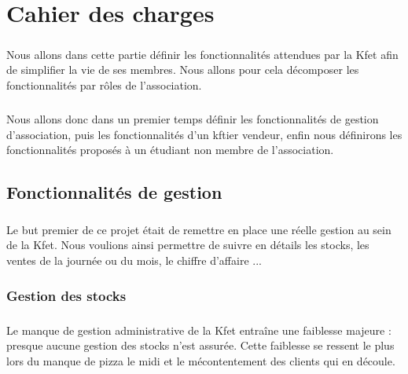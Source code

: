 \documentclass[twoside,UTF8]{EPURapport}
\begin{document}
\chapter{Cahier des charges}%

    \paragraph{}Nous allons dans cette partie définir les fonctionnalités attendues par la Kfet afin de simplifier la vie de ses membres. Nous allons pour cela décomposer les fonctionnalités par rôles de l'association. 
    \paragraph{}Nous allons donc dans un premier temps définir les fonctionnalités de gestion d'association, puis les fonctionnalités d'un kftier vendeur, enfin nous définirons les fonctionnalités proposés à un étudiant non membre de l'association.

    \section{Fonctionnalités de gestion}

        \paragraph{}Le but premier de ce projet était de remettre en place une réelle gestion au sein de la Kfet. Nous voulions ainsi permettre de suivre en détails les stocks, les ventes de la journée ou du mois, le chiffre d'affaire ...

        \subsection{Gestion des stocks}

            \paragraph{}Le manque de gestion administrative de la Kfet entraîne une faiblesse majeure : presque aucune
gestion des stocks n'est assurée. Cette faiblesse se ressent le plus lors du manque de pizza le midi et le
mécontentement des clients qui en découle.
\end{document}
